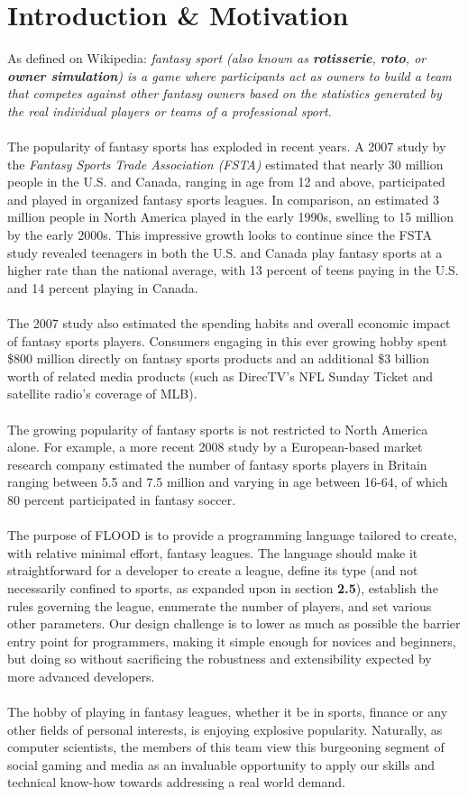 \documentclass[12pt]{article}
\begin{document}
\section{Introduction \& Motivation}
As defined on Wikipedia: \textit{fantasy sport (also known as \textbf{rotisserie}, \textbf{roto}, or \textbf{owner simulation}) is a game where participants act as owners to build a team that competes against other fantasy owners based on the statistics generated by the real individual players or teams of a professional sport.}
\\\\
The popularity of fantasy sports has exploded in recent years. A 2007 study by the \textit{Fantasy Sports Trade Association (FSTA)} estimated that nearly 30 million people in the U.S. and Canada, ranging in age from 12 and above, participated and played in organized fantasy sports leagues. In comparison, an estimated 3 million people in North America played in the early 1990s, swelling to 15 million by the early 2000s. This impressive growth looks to continue since the FSTA study revealed teenagers in both the U.S. and Canada play fantasy sports at a higher rate than the national average, with 13 percent of teens paying in the U.S. and 14 percent playing in Canada.
\\\\
The 2007 study also estimated the spending habits and overall economic impact of fantasy sports players. Consumers engaging in this ever growing hobby spent \$800 million directly on fantasy sports products and an additional \$3 billion worth of related media products (such as DirecTV's NFL Sunday Ticket and satellite radio's coverage of MLB).
\\\\
The growing popularity of fantasy sports is not restricted to North America alone. For example, a more recent 2008 study by a European-based market research company estimated the number of fantasy sports players in Britain ranging between 5.5 and 7.5 million and varying in age between 16-64, of which 80 percent participated in fantasy soccer.
\\\\
The purpose of FLOOD is to provide a programming language tailored to create, with relative minimal effort, fantasy leagues. The language should make it straightforward for a developer to create a league, define its type (and not necessarily confined to sports, as expanded upon in section \textbf{2.5}), establish the rules governing the league, enumerate the number of players, and set various other parameters. Our design challenge is to lower as much as possible the barrier entry point for programmers, making it simple enough for novices and beginners, but doing so without sacrificing the robustness and extensibility expected by more advanced developers.
\\\\
The hobby of playing in fantasy leagues, whether it be in sports, finance or any other fields of personal interests, is enjoying explosive popularity. Naturally, as computer scientists, the members of this team view this burgeoning segment of social gaming and media as an invaluable opportunity to apply our skills and technical know-how towards addressing a real world demand.
\end{document}
